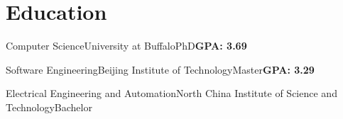 

\section{Education}

{Computer Science}{University at Buffalo}{PhD}{\textbf{GPA: 3.69}}
{
}

{Software Engineering}{Beijing Institute of Technology}{Master}{\textbf{GPA: 3.29}}
{
}

{Electrical Engineering and Automation}{North China Institute of Science and Technology}{Bachelor}{}
{
}
